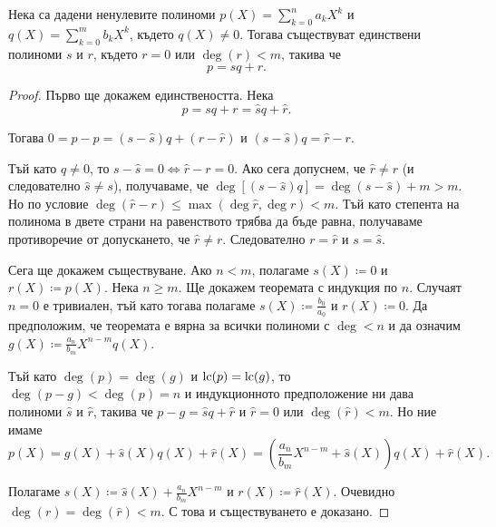 \documentclass[
  headings=standardclasses,
  bibliography=totocnumbered,
]{scrartcl}
\begin{document}
\begin{theorem}\label{thm:polynomial_division}
  Нека са дадени ненулевите полиноми \( p(X) = \sum_{k=0}^n a_k X^k \) и \( q(X) = \sum_{k=0}^m b_k X^k \), където \( q(X) \neq 0 \). Тогава съществуват единствени полиноми \( s \) и \( r \), където \( r = 0 \) или \( \deg(r) < m \), такива че
  \begin{equation*}
    p = sq + r.
  \end{equation*}
\end{theorem}
\begin{proof}
  Първо ще докажем единствеността. Нека
  \begin{equation*}
    p = sq + r = \hat sq + \hat r.
  \end{equation*}

  Тогава \( 0 = p - p = (s - \hat s) q + (r - \hat r) \) и \( (s - \hat s) q = \hat r - r \).

  Тъй като \( q \neq 0 \), то \( s - \hat s = 0 \iff \hat r - r = 0 \). Ако сега допуснем, че \( \hat r \neq r \) (и следователно \( \hat s \neq s \)), получаваме, че \( \deg[(s - \hat s) q] = \deg(s - \hat s) + m > m \). Но по условие \( \deg(\hat r - r) \leq \max(\deg \hat r, \deg r) < m \). Тъй като степента на полинома в двете страни на равенството трябва да бъде равна, получаваме противоречие от допускането, че \( \hat r \neq r \). Следователно \( r = \hat r \) и \( s = \hat s \).

  Сега ще докажем съществуване. Ако \( n < m \), полагаме \( s(X) \coloneqq 0 \) и \( r(X) \coloneqq p(X) \). Нека \( n \geq m \). Ще докажем теоремата с индукция по \( n \). Случаят \( n = 0 \) е тривиален, тъй като тогава полагаме \( s(X) \coloneqq \frac {b_0} {a_0} \) и \( r(X) \coloneqq 0 \). Да предположим, че теоремата е вярна за всички полиноми с \( \deg < n \) и да означим \( g(X) \coloneqq \frac {a_n} {b_m} X^{n-m} q(X) \).

  Тъй като \( \deg(p) = \deg(g) \) и \( \operatorname{lc}(p) = \operatorname{lc}(g) \), то \( \deg(p - g) < \deg(p) = n \) и индукционното предположение ни дава полиноми \( \hat s \) и \( \hat r \), такива че \( p - g = \hat s q + \hat r \) и \( \hat r = 0 \) или \( \deg(\hat r) < m \). Но ние имаме
  \begin{equation*}
    p(X)
    =
    g(X) + \hat s(X) q(X) + \hat r(X)
    =
    \left( \frac {a_n} {b_m} X^{n-m} + \hat s(X) \right) q(X) + \hat r(X).
  \end{equation*}

  Полагаме \( s(X) \coloneqq \hat s(X) + \frac {a_n} {b_m} X^{n-m} \) и \( r(X) \coloneqq \hat r(X) \). Очевидно \( \deg(r) = \deg(\hat r) < m \). С това и съществуването е доказано.
\end{proof}
\end{document}
